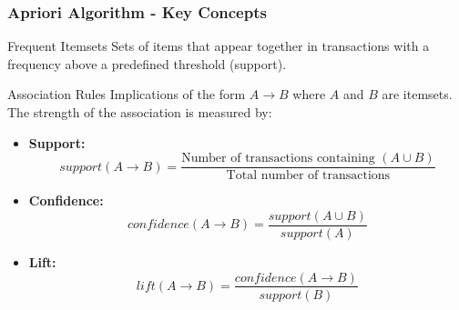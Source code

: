 \documentclass[aspectratio=169]{beamer}
\begin{document}
\begin{frame}[fragile]
    \frametitle{Apriori Algorithm - Key Concepts}
    \begin{block}{Frequent Itemsets}
        Sets of items that appear together in transactions with a frequency above a predefined threshold (support).
    \end{block}
    
    \begin{block}{Association Rules}
        Implications of the form \( A \rightarrow B \) where \( A \) and \( B \) are itemsets. The strength of the association is measured by:
        \begin{itemize}
            \item \textbf{Support:} 
            \[
            support(A \rightarrow B) = \frac{\text{Number of transactions containing } (A \cup B)}{\text{Total number of transactions}}
            \]
            \item \textbf{Confidence:} 
            \[
            confidence(A \rightarrow B) = \frac{support(A \cup B)}{support(A)}
            \]
            \item \textbf{Lift:} 
            \[
            lift(A \rightarrow B) = \frac{confidence(A \rightarrow B)}{support(B)}
            \]
        \end{itemize}
    \end{block}
\end{frame}
\end{document}
